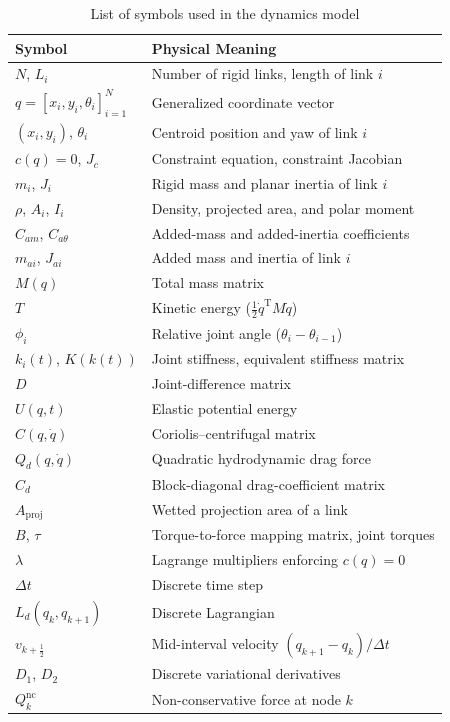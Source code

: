 \begin{table}[t]
  \caption{List of symbols used in the dynamics model}
  \label{tab:params}
  \centering
  \small
  \renewcommand{\arraystretch}{1.1}
  \begin{tabular}{@{}p{2.4cm}p{5.8cm}@{}}
    \hline
    \textbf{Symbol} & \textbf{Physical Meaning} \\
    \hline
    $N$, $L_i$ & Number of rigid links, length of link $i$ \\
    $q=[x_i,y_i,\theta_i]_{i=1}^{N}$ & Generalized coordinate vector \\
    $(x_i,y_i)$, $\theta_i$ & Centroid position and yaw of link $i$ \\
    $c(q)=0$, $J_c$ & Constraint equation, constraint Jacobian \\
    $m_i$, $J_i$ & Rigid mass and planar inertia of link $i$ \\
    $\rho$, $A_i$, $I_i$ & Density, projected area, and polar moment \\
    $C_{am}$, $C_{a\theta}$ & Added-mass and added-inertia coefficients \\
    $m_{ai}$, $J_{ai}$ & Added mass and inertia of link $i$ \\
    $M(q)$ & Total mass matrix \\
    $T$ & Kinetic energy ($\frac{1}{2}\dot{q}^{\mathrm{T}}M\dot{q}$) \\
    $\phi_i$ & Relative joint angle ($\theta_i-\theta_{i-1}$) \\
    $k_i(t)$, $K(k(t))$ & Joint stiffness, equivalent stiffness matrix \\
    $D$ & Joint-difference matrix \\
    $U(q,t)$ & Elastic potential energy \\
    $C(q,\dot{q})$ & Coriolis--centrifugal matrix \\
    $Q_d(q,\dot{q})$ & Quadratic hydrodynamic drag force \\
    $C_d$ & Block-diagonal drag-coefficient matrix \\
    $A_{\text{proj}}$ & Wetted projection area of a link \\
    $B$, $\tau$ & Torque-to-force mapping matrix, joint torques \\
    $\lambda$ & Lagrange multipliers enforcing $c(q)=0$ \\
    $\Delta t$ & Discrete time step \\
    $L_d(q_k,q_{k+1})$ & Discrete Lagrangian \\
    $v_{k+\frac{1}{2}}$ & Mid-interval velocity $(q_{k+1}-q_k)/\Delta t$ \\
    $D_1$, $D_2$ & Discrete variational derivatives \\
    $Q^{\text{nc}}_k$ & Non-conservative force at node $k$ \\
    \hline
  \end{tabular}
\end{table}

